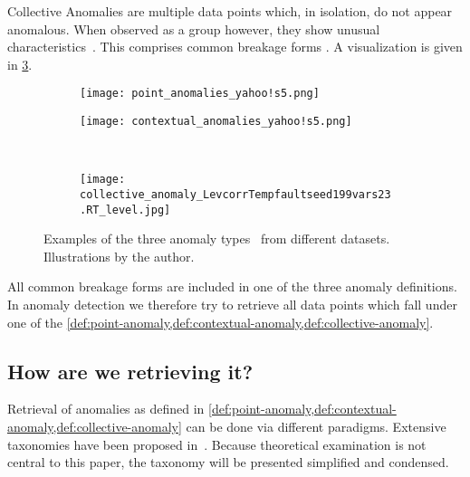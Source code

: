 \begin{definition}\label{def:collective-anomaly}
    Collective Anomalies are multiple data points which, in isolation, do not appear
    anomalous. When observed as a group however, they show unusual
    characteristics~\cite[cf.][]{Chandola.2009}. This comprises common breakage
    forms . A visualization is given in
    \cref{fig:collective-anomaly}.
\end{definition}

\begin{figure}[htp!]
    \begin{subfigure}[b]{.45\linewidth}
        \centering
        \texttt{[image: point\_anomalies\_yahoo!s5.png]}
        \label{fig:point-anomaly}
    \end{subfigure}%
    \hfill
    \begin{subfigure}[b]{.45\linewidth}
        \centering
        \texttt{[image: contextual\_anomalies\_yahoo!s5.png]}
        \label{fig:contextual-anomaly}
    \end{subfigure}\\[1ex]
    \begin{subfigure}[b]{\linewidth}
        \centering
        \texttt{[image: collective\_anomaly\_LevcorrTempfaultseed199vars23.RT\_level.jpg]}
        \label{fig:collective-anomaly}
    \end{subfigure}
    \caption{Examples of the three anomaly types~\cite{Chandola.2009} from different datasets. Illustrations by the author.}\label{fig:anomaly-types}
\end{figure}

All common breakage forms are included in one of the three anomaly definitions.
In anomaly detection we therefore try to retrieve all data points which fall
under one of the \cref{def:point-anomaly,def:contextual-anomaly,def:collective-anomaly}.

\subsection{How are we retrieving it?}\label{subsect:how-are-we-retrieving-it}
Retrieval of anomalies as defined in \cref{def:point-anomaly,def:contextual-anomaly,def:collective-anomaly}
can be done via different paradigms. Extensive taxonomies have been proposed in~\cite{Chandola.2009,Zietlow.2020}.
Because theoretical examination is not central to this paper, the taxonomy will
be presented simplified and condensed.

